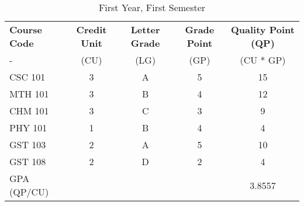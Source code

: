 \documentclass{article}
\begin{document}
\begin{table}[h!]
	\begin{center}
				\caption{First Year, First Semester}
		\label{tab:table1}
		\begin{tabular}{l|c|c|c|c|}
			\textbf{Course Code} & \textbf{Credit Unit} & \textbf{Letter Grade} & \textbf{Grade Point} & \textbf{Quality Point (QP)}\\
			- & (CU) & (LG) & (GP) & (CU * GP)\\
			\hline
			CSC 101 & 3 & A & 5 & 15\\
			MTH 101 & 3 & B & 4 & 12\\
			CHM 101 & 3 & C & 3 & 9\\
			PHY 101 & 1 & B & 4 & 4\\
			GST 103 & 2 & A & 5 & 10\\
			GST 108 & 2 & D & 2 & 4\\
			GPA (QP/CU) & & & & 3.8557\\
		\end{tabular}
	\end{center}
\end{table}	
	
\end{document}

